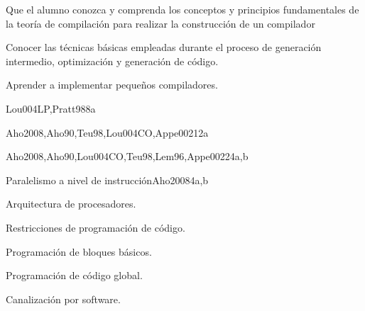 \begin{syllabus}


\begin{justification}
Que el alumno conozca y comprenda los conceptos y principios
fundamentales de la teoría de compilación para realizar la
construcción de un compilador
\end{justification}

\begin{goals}
\item Conocer las técnicas básicas empleadas durante el proceso de generación intermedio, optimización y generación de código.
\item Aprender a implementar pequeños compiladores.
\end{goals}

\begin{outcomes}
\end{outcomes}

\begin{unit}{\PLOverviewDef}{Lou004LP,Pratt98}{8}{a}
   \PLOverviewAllTopics
   \PLOverviewAllObjectives
\end{unit}

\begin{unit}{\PLBasicLanguageTranslationDef}{Aho2008,Aho90,Teu98,Lou004CO,Appe002}{12}{a}
   \PLBasicLanguageTranslationAllTopics
   \PLBasicLanguageTranslationAllObjectives
\end{unit}

\begin{unit}{\PLLanguageTranslatioSystemsDef}{Aho2008,Aho90,Lou004CO,Teu98,Lem96,Appe002}{24}{a,b}
   \PLLanguageTranslatioSystemsAllTopics
   \PLLanguageTranslatioSystemsAllObjectives
\end{unit}

\begin{unit}{Paralelismo a nivel de instrucción}{Aho2008}{4}{a,b}
  \begin{topics}
     \item Arquitectura de procesadores.
     \item Restricciones de programación de código.
     \item Programación de bloques básicos.
     \item Programación de código global.
     \item Canalización por software.
  \end{topics}


\end{unit}
\end{syllabus}
